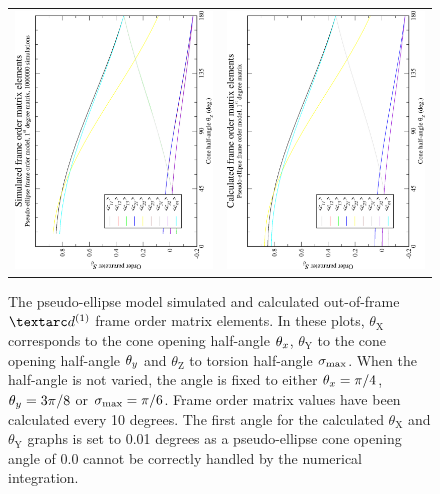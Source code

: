 \begin{figure}
\begin{tabular}{@{}cc@{}}
    \\[-5pt]
    \includegraphics[width=.35\textwidth,angle=270]{images/frame_order_matrix/Sij_pseudo-ellipse_out_of_frame_theta_z_ens1000000.eps} &
    \includegraphics[width=.35\textwidth,angle=270]{images/frame_order_matrix/Sij_pseudo-ellipse_out_of_frame_theta_z_calc.eps} \\
  \end{tabular}
  \caption[Pseudo-ellipse simulated and calculated out-of-frame $\FOone$ elements.]{
    The pseudo-ellipse model simulated and calculated out-of-frame $\FOone$ frame order matrix elements.
    In these plots, $\theta_\textrm{X}$ corresponds to the cone opening half-angle $\theta_x$, $\theta_\textrm{Y}$ to the cone opening half-angle $\theta_y$ and $\theta_\textrm{Z}$ to torsion half-angle $\sigma_\textrm{max}$.
    When the half-angle is not varied, the angle is fixed to either $\theta_x = \pi/4$, $\theta_y = 3\pi/8$ or $\sigma_\textrm{max} = \pi/6$.
    Frame order matrix values have been calculated every 10 degrees.
    The first angle for the calculated $\theta_\textrm{X}$ and $\theta_\textrm{Y}$ graphs is set to 0.01 degrees as a pseudo-ellipse cone opening angle of 0.0 cannot be correctly handled by the numerical integration.
  }
  \label{fig: simulated and calculated out-of-frame 1st degree pseudo-ellipse frame order}
\end{figure}


